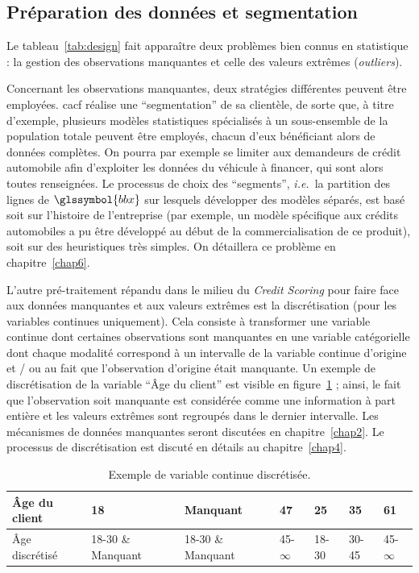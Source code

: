 \subsection{Préparation des données et segmentation}

Le tableau~\ref{tab:design} fait apparaître deux problèmes bien connus en statistique : la gestion des observations manquantes et celle des valeurs extrêmes (\textit{outliers}).


Concernant les observations manquantes, deux stratégies différentes peuvent être employées. \gls{cacf} réalise une ``segmentation'' de sa clientèle, de sorte que, à titre d'exemple, plusieurs modèles statistiques spécialisés à un sous-ensemble de la population totale peuvent être employés, chacun d'eux bénéficiant alors de données complètes. On pourra par exemple se limiter aux demandeurs de crédit automobile afin d'exploiter les données du véhicule à financer, qui sont alors toutes renseignées. Le processus de choix des ``segments'', \textit{i.e.}\ la partition des lignes de $\glssymbol{bbx}$ sur lesquels développer des modèles séparés, est basé soit sur l'histoire de l'entreprise (par exemple, un modèle spécifique aux crédits automobiles a pu être développé au début de la commercialisation de ce produit), soit sur des heuristiques très simples. On détaillera ce problème en chapitre~\ref{chap6}.

L'autre pré-traitement répandu dans le milieu du \textit{Credit Scoring} pour faire face aux données manquantes et aux valeurs extrêmes est la discrétisation (pour les variables continues uniquement). Cela consiste à transformer une variable continue dont certaines observations sont manquantes en une variable catégorielle dont chaque modalité correspond à un intervalle de la variable continue d'origine et / ou au fait que l'observation d'origine était manquante. Un exemple de discrétisation de la variable ``Âge du client'' est visible en figure~\ref{tab:disc_ex} ; ainsi, le fait que l'observation soit manquante est considérée comme une information à part entière et les valeurs extrêmes sont regroupés dans le dernier intervalle. Les mécanismes de données manquantes seront discutées en chapitre~\ref{chap2}. Le processus de discrétisation est discuté en détails au chapitre~\ref{chap4}.

\begin{table}
\centering
\begin{tabular}{l|l|l|l|l|l|l}
Âge du client & 18 & Manquant & 47 & 25 & 35 & 61 \\
\hline
Âge discrétisé & 18-30 \& Manquant & 18-30 \& Manquant & 45-$\infty$ & 18-30 & 30-45 & 45-$\infty$ \\
\end{tabular}
\caption{\label{tab:disc_ex} Exemple de variable continue discrétisée.}
\end{table}

